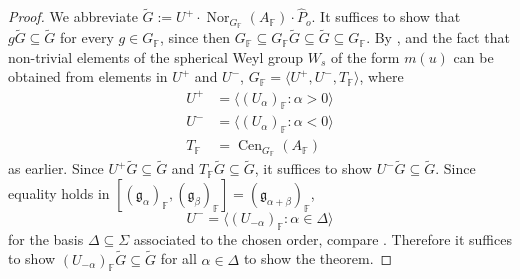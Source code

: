 \documentclass[12pt]{amsart}
\newcommand{\F}{\mathbb{F} }
\newcommand{\frakg}{\mathfrak{g}}
\numberwithin{equation}{section}
\theoremstyle{remark} %
\begin{document}
		\begin{proof}
			We abbreviate $\tilde{G} := U^+ \cdot \operatorname{Nor}_{G_\F}(A_\F) \cdot \hat{P}_o$. It suffices to show that $g\tilde{G} \subseteq \tilde{G}$ for every $g\in G_\F$, since then $G_\F \subseteq G_\F \tilde{G} \subseteq \tilde{G} \subseteq G_\F$. By \cite[Theorem \ref{I-thm:BWB}]{AppAGRCF}, and the fact that non-trivial elements of the spherical Weyl group $W_s$ of the form $m(u)$ can be obtained from elements in $U^+$ and $U^-$, $G_\F = \langle U^+, U^-, T_\F  \rangle$, where 
			\begin{align*}
				U^+ &= \langle (U_\alpha)_\F \colon \alpha >0 \rangle \\
				U^- &= \langle (U_\alpha)_\F \colon \alpha <0 \rangle \\
				T_\F &= \operatorname{Cen}_{G_\F} (A_\F)
			\end{align*}
			as earlier. Since $U^+ \tilde{G} \subseteq \tilde{G}$ and $T_\F \tilde{G} \subseteq \tilde{G}$, it suffices to show $U^- \tilde{G} \subseteq \tilde{G}$. Since equality holds in $[(\frakg_\alpha)_\F, (\frakg_\beta)_\F] = (\frakg_{\alpha + \beta})_\F$, 
			$$
			U^- = \langle (U_{-\alpha})_\F \colon \alpha \in \Delta \rangle
			$$
			for the basis $\Delta \subseteq \Sigma$ associated to the chosen order, compare \cite[Remark 14.5(2)]{Bor}. Therefore it suffices to show $(U_{-\alpha})_\F \tilde{G} \subseteq \tilde{G}$ for all $\alpha\in \Delta$ to show the theorem.
			

\end{proof}
\end{document}
